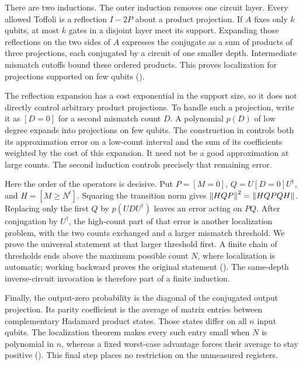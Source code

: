 There are two inductions. The outer induction removes one circuit layer.
Every allowed Toffoli is a reflection $I-2P$ about a product projection.
If $A$ fixes only $k$ qubits, at most $k$ gates in a disjoint layer meet
its support. Expanding those reflections on the two sides of $A$
expresses the conjugate as a sum of products of three projections,
each conjugated by a circuit of one smaller depth. Intermediate mismatch
cutoffs bound these ordered products. This proves localization for
projections supported on few qubits ().

The reflection expansion has a cost exponential in the support size,
so it does not directly control arbitrary product projections. To handle
such a projection, write it as $[D=0]$ for a second mismatch count $D$.
A polynomial $p(D)$ of low degree expands
into projections on few qubits. The construction in 
controls both its approximation error on a low-count interval and the
sum of its coefficients weighted by the cost of this expansion.
It need not be a good approximation at large counts. The second
induction controls precisely that remaining error.

Here the order of the operators is decisive. Put $P=[M=0]$,
$Q=U[D=0]U^\dagger$, and $H=[M\ge N^t]$. Squaring the transition
norm gives $\left\lVert HQP\right\rVert^2=\left\lVert HQPQH\right\rVert$. Replacing only the first
$Q$ by $p(UDU^\dagger)$ leaves an error acting on $PQ$. After
conjugation by $U^\dagger$, the high-count part of that error is another
localization problem, with the two counts exchanged and a larger
mismatch threshold. We prove the universal statement at that larger
threshold first. A finite chain of thresholds ends above the maximum
possible count $N$, where localization is automatic; working backward
proves the original statement (). The same-depth
inverse-circuit invocation is therefore part of a finite induction.

Finally, the output-zero probability is the diagonal of the conjugated
output projection. Its parity coefficient is the average of matrix
entries between complementary Hadamard product states. Those states
differ on all $n$ input qubits. The localization theorem makes every
such entry small when $N$ is polynomial in $n$, whereas a fixed
worst-case advantage forces their average to stay positive
(). This final step places no restriction on the
unmeasured registers.

